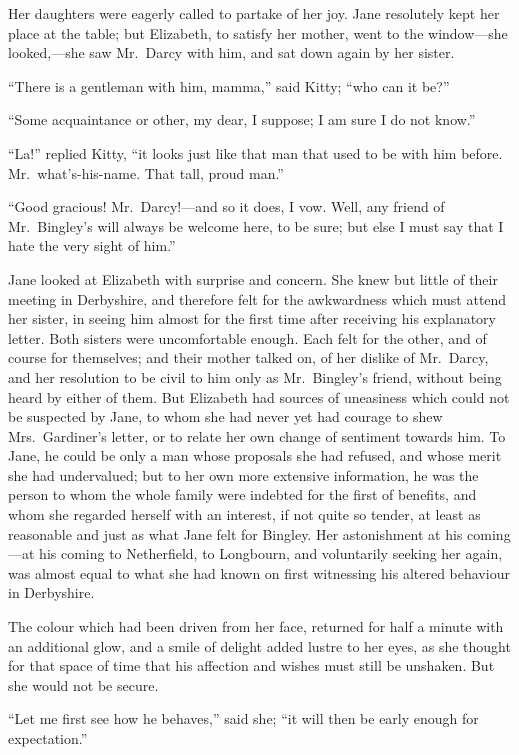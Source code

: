 Her daughters were eagerly called to partake of her joy.  Jane
resolutely kept her place at the table; but Elizabeth, to
satisfy her mother, went to the window---she looked,---she
saw Mr.\ Darcy with him, and sat down again by her sister.

``There is a gentleman with him, mamma,'' said Kitty; ``who can it be?''

``Some acquaintance or other, my dear, I suppose; I am sure I
do not know.''

``La!'' replied Kitty, ``it looks just like that man that used to
be with him before.  Mr.\ what's-his-name.  That tall, proud
man.''

``Good gracious!  Mr.\ Darcy!---and so it does, I vow.  Well,
any friend of Mr.\ Bingley's will always be welcome here, to be
sure; but else I must say that I hate the very sight of him.''

Jane looked at Elizabeth with surprise and concern.  She knew
but little of their meeting in Derbyshire, and therefore felt
for the awkwardness which must attend her sister, in seeing him
almost for the first time after receiving his explanatory
letter.  Both sisters were uncomfortable enough.  Each felt
for the other, and of course for themselves; and their mother
talked on, of her dislike of Mr.\ Darcy, and her resolution
to be civil to him only as Mr.\ Bingley's friend, without
being heard by either of them.  But Elizabeth had sources of
uneasiness which could not be suspected by Jane, to whom she
had never yet had courage to shew Mrs.\ Gardiner's letter, or
to relate her own change of sentiment towards him.  To Jane,
he could be only a man whose proposals she had refused, and
whose merit she had undervalued; but to her own more extensive
information, he was the person to whom the whole family were
indebted for the first of benefits, and whom she regarded
herself with an interest, if not quite so tender, at least
as reasonable and just as what Jane felt for Bingley.  Her
astonishment at his coming---at his coming to Netherfield, to
Longbourn, and voluntarily seeking her again, was almost equal
to what she had known on first witnessing his altered behaviour
in Derbyshire.

The colour which had been driven from her face, returned for
half a minute with an additional glow, and a smile of delight
added lustre to her eyes, as she thought for that space of time
that his affection and wishes must still be unshaken.  But she
would not be secure.

``Let me first see how he behaves,'' said she; ``it will then be
early enough for expectation.''

